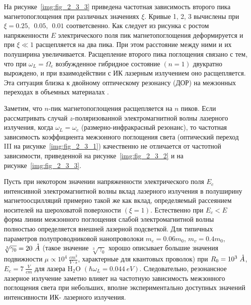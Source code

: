 На рисунке~\ref{img:fig_2_3_3} приведена частотная зависимость второго пика магнетопоглощения при различных значениях $\xi $. Кривые 1, 2, 3 вычислены при $\xi =0.25,\ \ 0.05,\ \ 0.01$ соответсвенно. Как следует из рисунка с ростом напряженности $E$ электрического поля пик магнетопоглощения деформируется и при $\xi \ll 1$ расщепляется на два пика. При этом расстояние между ними и их полуширина увеличивается. Расщепление второго пика поглощения связано с тем, что при $\omega_L=\Omega_e$ возбужденное гибридное состояние $(n=1)$ двукратно вырождено, и при взаимодействии с ИК лазерным излучением оно расщепляется. Эта ситуация близка к двойному оптическому резонансу (ДОР) на межзонных переходах в объемных материалах \cite{Perlin1970}.

Заметим, что $n$-пик магнетопоглощения расщепляется на $n$ пиков. Если рассматривать случай $z$-поляризованной электромагнитной волны лазерного излучения, когда $\omega_L=\omega_e$ (размерно-инфракрасный резонанс), то частотная зависимость коэффициента межзонного поглощения света (оптический переход III на рисунке~\ref{img:fig_2_3_1}) качественно не отличается от частотной зависимости, приведенной на рисунке~\ref{img:fig_2_3_2} и на рисунке~\ref{img:fig_2_3_3}.

Пусть при некотором значении напряженности электрического поля $E_c$ интенсивной электромагнитной волны вклад лазерного излучения в полуширину магнетоосцилляций примерно такой же как вклад, определяемый рассеянием носителей на шероховатой поверхности $(\xi =1)$. Естественно при $E_c<E$ форма линии межзонного поглощения слабой электромагнитной волны полностью определяется внешней лазерной подсветкой. Для типичных параметров полупроводниковой нанопроволоки $m_e=0.06m_0$, $m_v=0.4m_0$, $\sqrt[3]{\gamma_0}=20\ \AA $ (такое значение $\sqrt[3]{\gamma_0}$ хорошо описывает большие значения подвижности $\mu \propto 10^4\ \frac{cm^2}{V\cdot s}$, характерные для квантовых проволок) при $R_0=10^3\ \AA $, $E_c= 7\ \frac{V}{cm}$ для лазера $\mathrm{H_2 O}$ $\left(\hbar {\omega }_L=0.044\ eV\right)$. Следовательно, резонансное лазерное излучение заметно влияет на частотную зависимость межзонного поглощения света при небольших, вполне экспериментально доступных значений интенсивности ИК- лазерного излучения.
